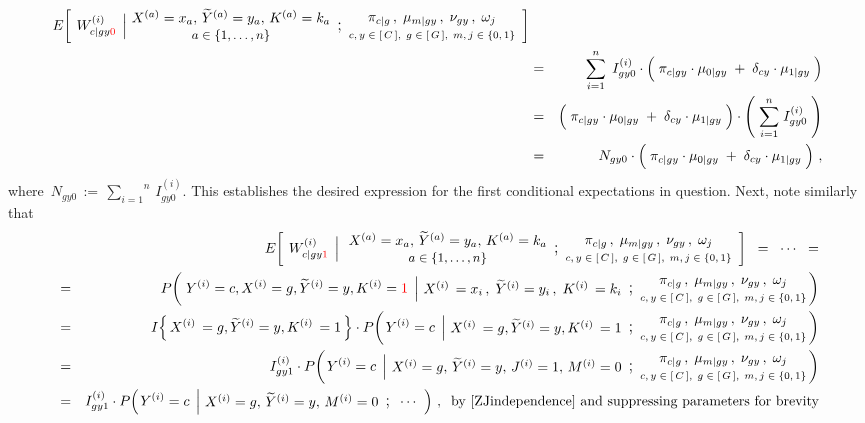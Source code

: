 \begin{enumerate}
\begin{eqnarray*}
		E\!\left[\;
			\left.
			W^{(i)}_{c \vert gy{\color{red}0}}
			\,\;\right\vert
			\!\!
			\EMConditionsWithValues
		\right]
	\\
	&=&
		\overset{n}{\underset{i=1}{\sum}} \;\,
		I^{(i)}_{gy0}
		\cdot
		\left(\;
			\pi_{c \vert gy}
			\cdot
			\mu_{0 \vert gy}
			\;\overset{{\color{white}.}}{+}\;
			\delta_{cy}
			\cdot
			\mu_{1 \vert gy}
		\;\right)
	\\
	&=&
		\left(\;
			\pi_{c \vert gy}
			\cdot
			\mu_{0 \vert gy}
			\;\overset{{\color{white}.}}{+}\;
			\delta_{cy}
			\cdot
			\mu_{1 \vert gy}
		\;\right)
		\cdot
		\left(\; \overset{n}{\underset{i=1}{\sum}} \; I^{(i)}_{gy0} \;\right)
	\\
	&=&
		N_{gy0}
		\cdot
		\left(\;
			\pi_{c \vert gy}
			\cdot
			\mu_{0 \vert gy}
			\;\overset{{\color{white}.}}{+}\;
			\delta_{cy}
			\cdot
			\mu_{1 \vert gy}
		\;\right)\,,
	\end{eqnarray*}
	where \,$N_{gy0} \,:=\, \overset{n}{\underset{i=1}{\sum}} \, I^{(i)}_{gy0}$.
	This establishes the desired expression for the first conditional expectations in question.
	Next, note similarly that
	\begin{eqnarray*}
	&&
		E\!\left[\;
			\left.
			W^{(i)}_{c \vert gy{\color{red}1}}
			\,\;\right\vert
			\EMConditionsWithValues
		\right]
		\;\; = \;\; \cdots \;\; =
	\\
	&=&
		P\!\left(\,
			\left.
			Y^{(i)} = c, X^{(i)} = g, \widetilde{Y}^{(i)} = y, K^{(i)} = {\color{red}1}
			\,\;\right\vert
			\!\!
			\ithEMConditionsWithValues
		\!\!\right)
	\\
	&=&
		I\!\left\{\,X^{(i)}\,=g , \widetilde{Y}^{(i)}=y , K^{(i)}\,=1\,\right\}
		\cdot
		P\!\left(
			\left.
			Y^{(i)} = c
			\,\;\right\vert
			\!\!
			\ithGYOneEMConditionsWithValues
		\!\!\right)
	\\
	&=&
		I^{(i)}_{gy1}
		\cdot
		P\!\left(
			\left.
			Y^{(i)} = c
			\,\;\right\vert
			\!\!
			\begin{array}{c}
				X^{(i)} = g,\, \widetilde{Y}^{(i)} = y,\, J^{(i)} = 1,\, M^{(i)} = 0
			\end{array}
			\textnormal{\large;}
			\modelParameters
		\!\!\right)
	\\
	&=&
		I^{(i)}_{gy1}
		\cdot
		P\!\left(
			\left.
			Y^{(i)} = c
			\,\;\right\vert
			\!\!
			\begin{array}{c}
				X^{(i)} = g,\, \widetilde{Y}^{(i)} = y,\, M^{(i)} = 0
			\end{array}
			\textnormal{\large;}
			\;\;\cdots\;\;
		\right)\,,
		\;\;
		\textnormal{by \eqref{ZJindependence} and suppressing parameters for brevity}

\end{eqnarray*}
\end{enumerate}
